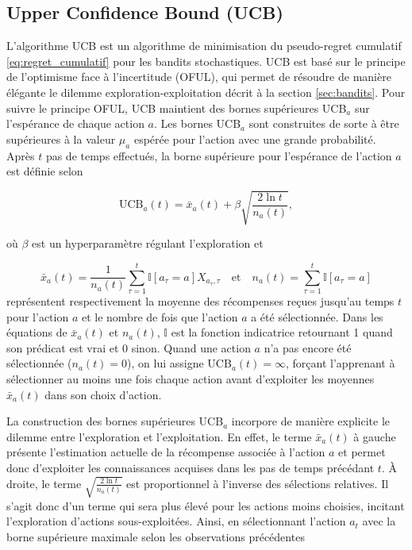 \subsection{Upper Confidence Bound (UCB)}
\label{subsec:ucb}

L'algorithme UCB \citep{ucb} est un algorithme de minimisation du pseudo-regret cumulatif \eqref{eq:regret_cumulatif}
pour les bandits stochastiques.
UCB est basé sur le principe de l'optimisme face à l'incertitude (OFUL), qui permet de
résoudre de manière élégante le dilemme exploration-exploitation décrit à la section 
\ref{sec:bandits}.
Pour suivre le principe OFUL, UCB maintient des bornes supérieures UCB$_a$ sur
l'espérance de chaque action $a$.
Les bornes UCB$_a$ sont construites de sorte à être supérieures à la valeur $\mu_a$ espérée
pour l'action avec une grande probabilité.
Après $t$ pas de temps effectués, la borne supérieure
pour l'espérance de l'action $a$ est définie selon

\begin{equation}
    \text{UCB}_a(t) = \bar{x}_a(t) + \beta \sqrt{\frac{2\ln t}{n_a(t)}},
    \label{eq:ucb}
\end{equation}

où $\beta$ est un hyperparamètre régulant l'exploration et 

\begin{equation*}
    \bar{x}_a (t) = \frac{1}{n_a (t)} \sum_{\tau = 1}^{t} \mathbb{I}\left[a_\tau = a\right] X_{a_\tau, \tau} \quad \text{et} \quad
    n_a (t) = \sum_{\tau = 1}^{t} \mathbb{I}\left[a_\tau = a\right]
\end{equation*}
représentent respectivement la moyenne des récompenses reçues jusqu'au temps $t$ pour l'action $a$ et
le nombre de fois que l'action $a$ a été sélectionnée.
Dans les équations de $\bar{x}_a (t)$ et $n_a(t)$, $\mathbb{I}$ est la fonction indicatrice retournant 1 quand 
son prédicat est vrai et 0 sinon.
Quand une action $a$ n'a pas encore été sélectionnée ($n_a(t)=0$), on 
lui assigne UCB$_a(t) = \infty$, forçant l'apprenant à sélectionner au moins 
une fois chaque action avant d'exploiter les moyennes $\bar{x}_a(t)$
dans son choix d'action.

La construction des bornes supérieures UCB$_a$ incorpore de manière explicite 
le dilemme entre l'exploration et l'exploitation.
En effet, le terme $\bar{x}_a(t)$ à gauche présente l'estimation actuelle de la récompense
associée à l'action $a$ et permet donc d'exploiter les connaissances acquises
dans les pas de temps précédant $t$.
À droite, le terme $\sqrt{\frac{2 \ln t}{n_a(t)}}$ est proportionnel à l'inverse
des sélections relatives.
Il s'agit donc d'un terme qui sera plus élevé pour les actions moins choisies,
incitant l'exploration d'actions sous-exploitées.
Ainsi, en sélectionnant l'action $a_t$ avec la borne supérieure maximale
selon les observations précédentes

